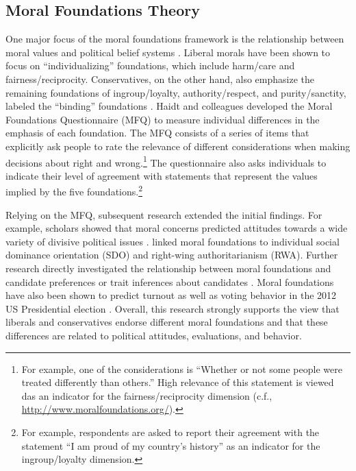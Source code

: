 \documentclass[12pt]{article}
\begin{document}
\subsection{Moral Foundations Theory}

One major focus of the moral foundations framework is the relationship between moral values and political belief systems \citep[c.f.,][]{haidt2012righteous}. Liberal morals have been shown to focus on ``individualizing'' foundations, which include harm/care and fairness/reciprocity. Conservatives, on the other hand, also emphasize the remaining foundations of ingroup/loyalty, authority/respect, and purity/sanctity, labeled the ``binding'' foundations \citep{haidt2007morality,graham2009liberals}. Haidt and colleagues developed the Moral Foundations Questionnaire (MFQ) to measure individual differences in the emphasis of each foundation. The MFQ consists of a series of items that explicitly ask people to rate the relevance of different considerations when making decisions about right and wrong.\footnote{For example, one of the considerations is ``Whether or not some people were treated differently than others.'' High relevance of this statement is viewed das an indicator for the fairness/reciprocity dimension (c.f., \url{http://www.moralfoundations.org/}).} The questionnaire also asks individuals to indicate their level of agreement with statements that represent the values implied by the five foundations.\footnote{For example, respondents are asked to report their agreement with the statement ``I am proud of my country's history'' as an indicator for the ingroup/loyalty dimension.}

Relying on the MFQ, subsequent research extended the initial findings. For example, scholars showed that moral concerns predicted attitudes towards a wide variety of divisive political issues \citep[e.g.][]{koleva2012tracing,kertzer2014moral,low2015moral}. \citet{federico2013mapping} linked moral foundations to individual social dominance orientation (SDO) and right-wing authoritarianism (RWA). Further research directly investigated the relationship between moral foundations and candidate preferences \citep{iyer2010beyond} or trait inferences about candidates \citep{clifford2014linking}. Moral foundations have also been shown to predict turnout \citep{johnson2014ideology} as well as voting behavior in the 2012 US Presidential election \citep{franks2015using}. Overall, this research strongly supports the view that liberals and conservatives endorse different moral foundations and that these differences are related to political attitudes, evaluations, and behavior.
\end{document}
